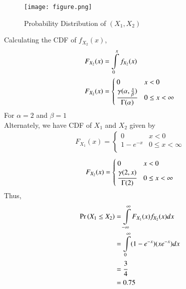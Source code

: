 \documentclass[journal,12pt,twocolumn]{IEEEtran}
\begin{document}
\begin{figure}[!ht]
\centering
\texttt{[image: figure.png]}
\caption{Probability Distribution of $(X_1, X_2)$}
\end{figure}

Calculating the CDF of $f_{X_2}(x)$,\\
\begin{align}
    F_{X_2}(x)&= \displaystyle\int\limits_0^x f_{X_2}(x)\\
    F_{X_2}(x)&=
    \begin{cases}
    0 & x<0\\
    \cfrac{\gamma(\alpha,\frac{x}{\beta})}{\Gamma(\alpha)} & 0 \le x <\infty
    \end{cases}
\end{align}
For $\alpha=2$ and $\beta=1$\\
Alternately, we have CDF of $X_1$ and $X_2$ given by 
\begin{align}
    F_{X_1}(x) = 
    \begin{cases}
     0   & x < 0\\
    1-e^{-x} & 0\le x < \infty\\
    \end{cases}
\end{align}
\begin{align}
    F_{X_2}(x) = 
    \begin{cases}
    0   & x < 0\\
    \cfrac{\gamma(2,x)}{\Gamma(2)} & 0\le x < \infty\\
    \end{cases}
\end{align}
Thus, 
\begin{align}
    \Pr\left(X_1\le X_2\right)&=\displaystyle\int\limits_{-\infty}^{\infty} F_{X_1}(x)f_{X_2}(x)dx\\
                &= \displaystyle\int\limits_0^\infty(1-e^{-x})(xe^{-x})dx\\
                &= \cfrac{3}{4}\\
                &= 0.75
\end{align}
\end{document}
